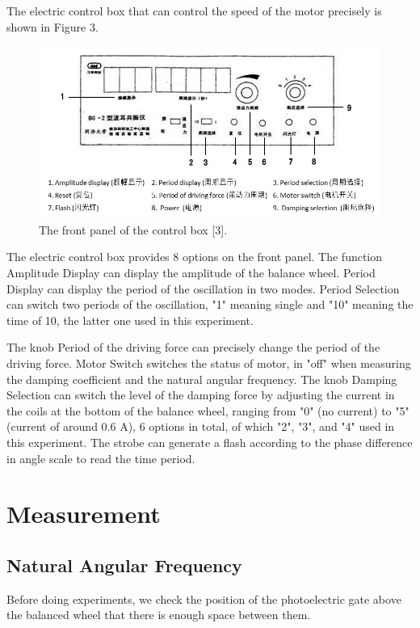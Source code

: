 \documentclass[a4paper]{report}
\begin{document}
	The electric control box that can control the speed of the motor precisely is shown in Figure 3.
	\begin{figure}[H]
		\centering
		\includegraphics[width=1\linewidth]{3.jpg}
		\caption{The front panel of the control box [3].}
	\end{figure}
	The electric control box provides 8 options on the front panel. The function \textsf{Amplitude Display} can display the amplitude of the balance wheel. \textsf{Period Display} can display the period of the oscillation in two modes. \textsf{Period Selection} can switch two periods of the oscillation, "1" meaning single and "10" meaning the time of 10, the latter one used in this experiment.
	
	The knob \textsf{Period of the driving force} can precisely change the period of the driving force. \textsf{Motor Switch} switches the status of motor, in "off" when measuring the damping coefficient and the natural angular frequency. The knob \textsf{Damping Selection} can switch the level of the damping force by adjusting the current in the coils at the bottom of the balance wheel, ranging from "0" (no current) to "5" (current of around 0.6 A), 6 options in total, of which "2", "3", and "4" used in this experiment. The strobe can generate a flash according to the phase difference in angle scale to read the time period.
	\section{Measurement}
	\subsection{Natural Angular Frequency}
	Before doing experiments, we check the position of the photoelectric gate above the balanced wheel that there is enough space between them.
	
\end{document}
